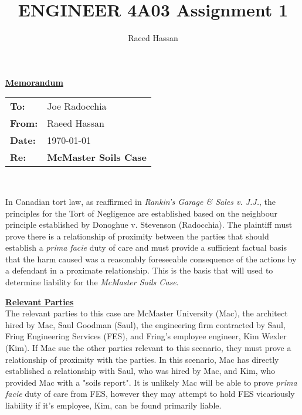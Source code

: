\documentclass[12pt,letterpaper]{article}
\title{ENGINEER 4A03 Assignment 1}
\author{Raeed Hassan}
\begin{document}
\maketitle
\clearpage

\begin{center}
	\textbf{\underline{Memorandum}}
\end{center}
\begin{tabular}{ll}
	\textbf{To:}	& Joe Radocchia\\
	\textbf{From:}	& Raeed Hassan\\
	\textbf{Date:}	& \today\\
	\textbf{Re:}	& \textbf{McMaster Soils Case}\\
\end{tabular}
\\\par
In Canadian tort law, as reaffirmed in \textit{Rankin's Garage \& Sales v. J.J.}, the principles for the Tort of Negligence are established based on the neighbour principle established by Donoghue v. Stevenson (Radocchia). The plaintiff must prove there is a relationship of proximity between the parties that should establish a \textit{prima facie} duty of care and must provide a sufficient factual basis that the harm caused was a reasonably foreseeable consequence of the actions by a defendant in a proximate relationship. This is the basis that will used to determine liability for the \textit{McMaster Soils Case}.

\par
\textbf{\underline{Relevant Parties}}\\
\indent
The relevant parties to this case are McMaster University (Mac), the architect hired by Mac, Saul Goodman (Saul), the engineering firm contracted by Saul, Fring Engineering Services (FES), and Fring's employee engineer, Kim Wexler (Kim). If Mac sue the other parties relevant to this scenario, they must prove a relationship of proximity with the parties. In this scenario, Mac has directly established a relationship with Saul, who was hired by Mac, and Kim, who provided Mac with a "soils report". It is unlikely Mac will be able to prove \textit{prima facie} duty of care from FES, however they may attempt to hold FES vicariously liability if it's employee, Kim, can be found primarily liable.
\end{document}

